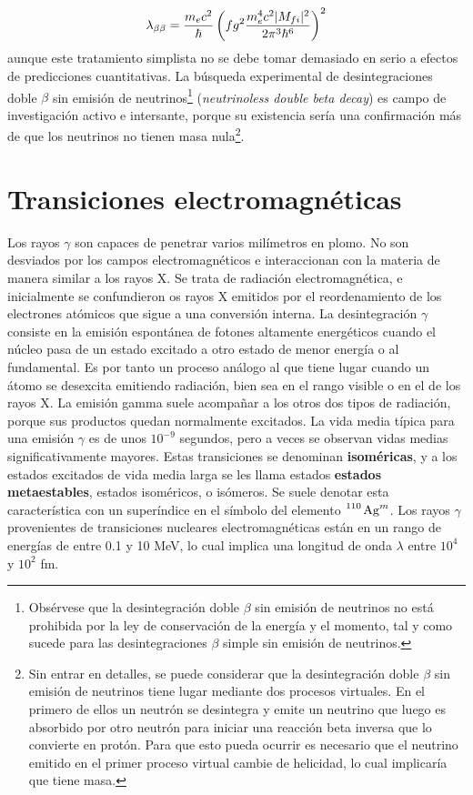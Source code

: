 \begin{eqnarray}
	\lambda_{\beta \beta} = \frac{m_e c^2}{\hbar} \left( fg^2 \frac{m_e^4 c^2 |M_{fi}|^2}{2\pi^3 \hbar^6} \right)^2
\end{eqnarray}
aunque este tratamiento simplista no se debe tomar demasiado en serio a efectos de predicciones cuantitativas. La búsqueda experimental de desintegraciones doble $\beta$ sin emisión de neutrinos\footnote{Obsérvese que la desintegración doble $\beta$ sin emisión de neutrinos no está prohibida por la ley de conservación de la energía y el momento, tal y como sucede para las desintegraciones $\beta$ simple sin emisión de neutrinos.} (\textit{neutrinoless double beta decay}) es campo de investigación activo e intersante, porque su existencia sería una confirmación más de que los neutrinos no tienen masa nula\footnote{Sin entrar en detalles, se puede considerar que la desintegración doble $\beta$ sin emisión de neutrinos tiene lugar mediante dos procesos virtuales. En el primero de ellos un neutrón se desintegra y emite un neutrino que luego es absorbido por otro neutrón para iniciar una reacción beta inversa que lo convierte en protón. Para que esto pueda ocurrir es necesario que el neutrino emitido en el primer proceso virtual cambie de helicidad, lo cual implicaría que tiene masa.}.


\section{Transiciones electromagnéticas}

Los rayos $\gamma$ son capaces de penetrar varios milímetros en plomo. No son desviados por los campos electromagnéticos e interaccionan con la materia de manera similar a los rayos X.  Se trata de radiación electromagnética, e inicialmente se confundieron os rayos X emitidos por el reordenamiento de los electrones atómicos que sigue a una conversión interna. La desintegración $\gamma$ consiste en la emisión espontánea de fotones altamente energéticos cuando el núcleo pasa de un estado excitado a otro estado de menor energía o al fundamental. Es por tanto un proceso análogo al que tiene lugar cuando un átomo se desexcita emitiendo radiación, bien sea en el rango visible o en el de los rayos X. La emisión gamma suele acompañar a los otros dos tipos de radiación, porque sus productos quedan normalmente excitados. La vida media típica para una emisión $\gamma$ es de unos $10^{-9}$ segundos, pero a veces se observan vidas medias significativamente mayores. Estas transiciones se denominan \textbf{isoméricas}, y a los estados excitados de vida media larga se les llama estados \textbf{estados metaestables}, estados isoméricos, o isómeros. Se suele denotar esta característica con un superíndice en el símbolo del elemento $\ce{^110 Ag^m}$. Los rayos $\gamma$ provenientes de transiciones nucleares electromagnéticas están en un rango de energías de entre 0.1 y 10 MeV, lo cual implica una longitud de onda $\lambda$ entre $10^4$ y $10^2$ fm. 

